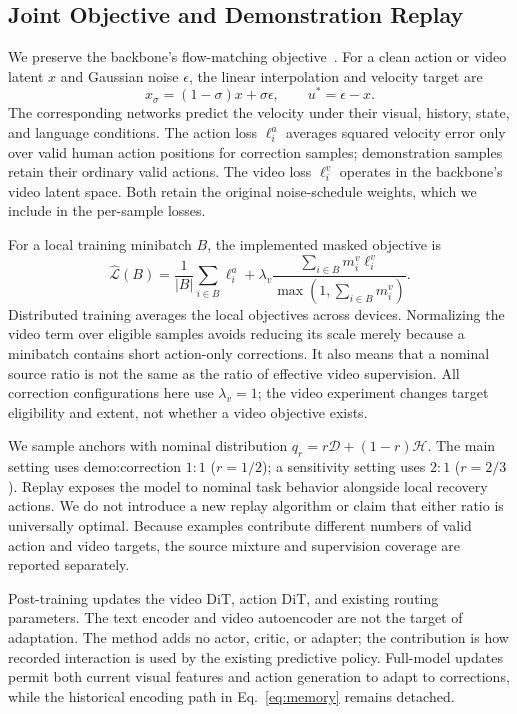 \documentclass[letterpaper,10pt,conference]{ieeeconf}
\begin{document}
\subsection{Joint Objective and Demonstration Replay}
We preserve the backbone's flow-matching objective~\cite{flow}. For a clean action or video latent $x$ and Gaussian noise $\epsilon$, the linear interpolation and velocity target are
\begin{equation}
 x_\sigma=(1-\sigma)x+\sigma\epsilon,\qquad
 u^*=\epsilon-x.
 \label{eq:flow}
\end{equation}
The corresponding networks predict the velocity under their visual, history, state, and language conditions. The action loss $\ell_i^a$ averages squared velocity error only over valid human action positions for correction samples; demonstration samples retain their ordinary valid actions. The video loss $\ell_i^v$ operates in the backbone's video latent space. Both retain the original noise-schedule weights, which we include in the per-sample losses.

For a local training minibatch $B$, the implemented masked objective is
\begin{equation}
 \widehat{\mathcal L}(B)=
 \frac{1}{|B|}\sum_{i\in B}\ell_i^a+
 \lambda_v\frac{\sum_{i\in B}m_i^v\ell_i^v}
 {\max(1,\sum_{i\in B}m_i^v)}.
 \label{eq:loss}
\end{equation}
Distributed training averages the local objectives across devices. Normalizing the video term over eligible samples avoids reducing its scale merely because a minibatch contains short action-only corrections. It also means that a nominal source ratio is not the same as the ratio of effective video supervision. All correction configurations here use $\lambda_v=1$; the video experiment changes target eligibility and extent, not whether a video objective exists.

We sample anchors with nominal distribution $q_r=r\mathcal D+(1-r)\mathcal H$. The main setting uses demo:correction $1{:}1$ ($r=1/2$); a sensitivity setting uses $2{:}1$ ($r=2/3$). Replay exposes the model to nominal task behavior alongside local recovery actions. We do not introduce a new replay algorithm or claim that either ratio is universally optimal. Because examples contribute different numbers of valid action and video targets, the source mixture and supervision coverage are reported separately.

Post-training updates the video DiT, action DiT, and existing routing parameters. The text encoder and video autoencoder are not the target of adaptation. The method adds no actor, critic, or adapter; the contribution is how recorded interaction is used by the existing predictive policy. Full-model updates permit both current visual features and action generation to adapt to corrections, while the historical encoding path in Eq.~\ref{eq:memory} remains detached.
\end{document}
